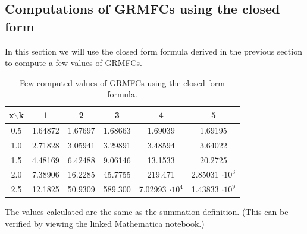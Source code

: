 \documentclass[12pt]{article}
\numberwithin{equation}{section}
\begin{document}
\subsection{Computations of GRMFCs using the closed form}
In this section we will use the closed form formula derived in the previous section to compute a few values of GRMFCs.
\begin{table}[h!]
\centering
\begin{tabular}{@{}cccccc@{}}
\toprule
x$\backslash$k & 1 & 2 & 3 & 4 & 5 \\ \midrule
0.5 & 1.64872 & 1.67697 & 1.68663 & 1.69039 & 1.69195 \\
1.0 & 2.71828 & 3.05941 & 3.29891 & 3.48594 & 3.64022 \\
1.5 & 4.48169 & 6.42488 & 9.06146 & 13.1533 & 20.2725 \\
2.0 & 7.38906 & 16.2285 & 45.7755 & 219.471 & 2.85031 $\cdot 10^3$ \\
2.5 & 12.1825 & 50.9309 & 589.300 & 7.02993 $\cdot 10^4$ & 1.43833 $\cdot 10^9$ \\ \bottomrule
\end{tabular}
\caption{Few computed values of GRMFCs using the closed form formula.}
\label{tab:GRMFCexamples}
\end{table}
\par The values calculated are the same as the summation definition. (This can be verified by viewing the linked Mathematica notebook.)

\end{document}
